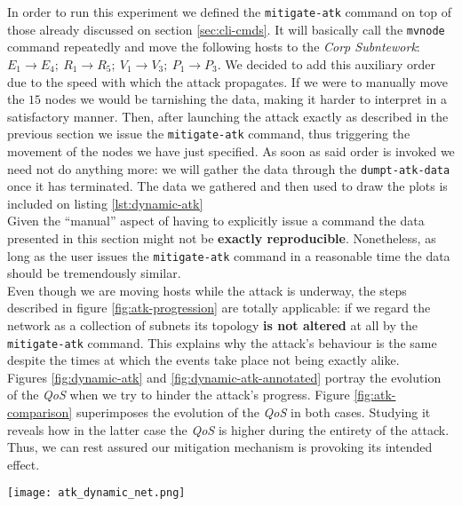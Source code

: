             In order to run this experiment we defined the \texttt{mitigate-atk} command on top of those already discussed on section \ref{sec:cli-cmds}. It will basically call the \texttt{mvnode} command repeatedly and move the following hosts to the \textit{Corp Subntework}: $E_1 \to E_4;\ R_1 \to R_5;\ V_1 \to V_3;\ P_1 \to P_3$. We decided to add this auxiliary order due to the speed with which the attack propagates. If we were to manually move the $15$ nodes we would be tarnishing the data, making it harder to interpret in a satisfactory manner. Then, after launching the attack exactly as described in the previous section we issue the \texttt{mitigate-atk} command, thus triggering the movement of the nodes we have just specified. As soon as said order is invoked we need not do anything more: we will gather the data through the \texttt{dumpt-atk-data} once it has terminated. The data we gathered and then used to draw the plots is included on listing \ref{lst:dynamic-atk}\\

            Given the ``manual'' aspect of having to explicitly issue a command the data presented in this section might not be \textbf{exactly reproducible}. Nonetheless, as long as the user issues the \texttt{mitigate-atk} command in a reasonable time the data should be tremendously similar.\\

            Even though we are moving hosts while the attack is underway, the steps described in figure \ref{fig:atk-progression} are totally applicable: if we regard the network as a collection of subnets its topology \textbf{is not altered} at all by the \texttt{mitigate-atk} command. This explains why the attack's behaviour is the same despite the times at which the events take place not being exactly alike.\\

            Figures \ref{fig:dynamic-atk} and \ref{fig:dynamic-atk-annotated} portray the evolution of the \textit{QoS} when we try to hinder the attack's progress. Figure \ref{fig:atk-comparison} superimposes the evolution of the \textit{QoS} in both cases. Studying it reveals how in the latter case the \textit{QoS} is higher during the entirety of the attack. Thus, we can rest assured our mitigation mechanism is provoking its intended effect.\\

            \begin{sidewaysfigure}
                \centering
                \texttt{[image: atk\_dynamic\_net.png]}
                \caption[\textit{QoS} on a Dynamic Topology]{Evolution of the \textit{QoS} Over Time for a Dynamic Topology.}
                \label{fig:dynamic-atk}
            \end{sidewaysfigure}

